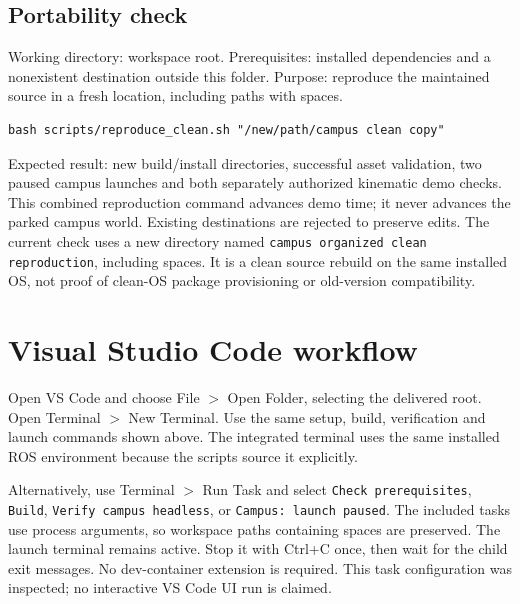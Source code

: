 \subsection{Portability check}
Working directory: workspace root. Prerequisites: installed dependencies and a nonexistent destination outside this folder. Purpose: reproduce the maintained source in a fresh location, including paths with spaces.
\begin{lstlisting}
bash scripts/reproduce_clean.sh "/new/path/campus clean copy"
\end{lstlisting}
Expected result: new build/install directories, successful asset validation, two paused campus launches and both separately authorized kinematic demo checks. This combined reproduction command advances demo time; it never advances the parked campus world. Existing destinations are rejected to preserve edits. The current check uses a new directory named \texttt{campus organized clean reproduction}, including spaces. It is a clean source rebuild on the same installed OS, not proof of clean-OS package provisioning or old-version compatibility.

\section{Visual Studio Code workflow}
Open VS Code and choose File $>$ Open Folder, selecting the delivered root. Open Terminal $>$ New Terminal. Use the same setup, build, verification and launch commands shown above. The integrated terminal uses the same installed ROS environment because the scripts source it explicitly.

Alternatively, use Terminal $>$ Run Task and select \texttt{Check prerequisites}, \texttt{Build}, \texttt{Verify campus headless}, or \texttt{Campus: launch paused}. The included tasks use process arguments, so workspace paths containing spaces are preserved. The launch terminal remains active. Stop it with Ctrl+C once, then wait for the child exit messages. No dev-container extension is required. This task configuration was inspected; no interactive VS Code UI run is claimed.

